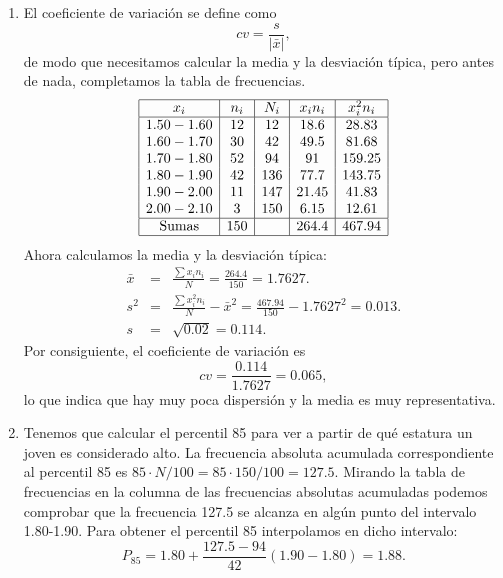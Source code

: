 {\begin{enumerate}
\item  El coeficiente de variación se define como
\[
cv=\dfrac{s}{|\bar{x}|},
\]
de modo que necesitamos calcular la media y la desviación típica, pero antes de nada, completamos la tabla de frecuencias.
\[
\begin{array}{|c|c|c|c|c|}
\hline
x_{i} & n_{i} & N_{i} & x_{i}n_{i} & x_{i}^2n_{i}\\ \hline
1.50-1.60 & 12 & 12 & 18.6 & 28.83 \\
1.60-1.70 & 30 & 42 & 49.5 & 81.68 \\
1.70-1.80 & 52 & 94 & 91 & 159.25\\
1.80-1.90 & 42 & 136 & 77.7 & 143.75\\
1.90-2.00 & 11 & 147 & 21.45 & 41.83\\
2.00-2.10 & 3 & 150 & 6.15 & 12.61\\ \hline
\mbox{Sumas} & 150 & & 264.4 & 467.94 \\
\hline
\end{array}
\]
Ahora calculamos la media y la desviación típica:
\begin{eqnarray*}
\bar{x} & = & \frac{\sum
x_{i}n_{i}}{N}=\frac{264.4}{150}=1.7627.\\
s^2 & = & \frac{\sum x_{i}^2 n_{i}}{N}-\bar{x}^2 =
\frac{467.94}{150}-1.7627^2=0.013.\\
s & = & \sqrt{0.02}=0.114.
\end{eqnarray*}
Por consiguiente, el coeficiente de variación es
\[ cv=\frac{0.114}{1.7627}=0.065, \]
lo que indica que hay muy poca dispersión y la media es muy representativa.

\item Tenemos que calcular el percentil 85 para ver a partir de qué estatura un joven es considerado alto.
La frecuencia absoluta acumulada correspondiente al percentil 85 es $85\cdot N/100=85\cdot 150/100 = 127.5$. 
Mirando la tabla de frecuencias en la columna de las frecuencias absolutas acumuladas podemos comprobar que la frecuencia 127.5 se alcanza en algún punto del intervalo 1.80-1.90.
Para obtener el percentil 85 interpolamos en dicho intervalo:
\[ P_{85}=1.80+\frac{127.5-94}{42}(1.90-1.80)=1.88. \]
\end{enumerate}
}


